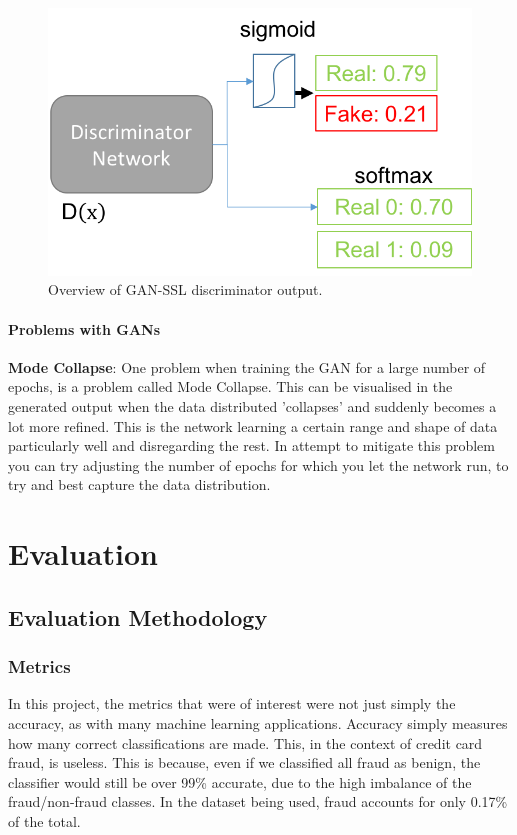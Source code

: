 \documentclass[12pt,a4paper,twoside]{report}
\begin{document}
\begin{figure}[H]
\centering
\includegraphics[scale=0.8]{gan-ssl}
\caption{Overview of GAN-SSL discriminator output.}
\label{fig:gan-ssl}
\end{figure}

\subsubsection{Problems with GANs}

\textbf{Mode Collapse}: One problem when training the GAN for a large number of epochs, is a problem called Mode Collapse. This can be visualised in the generated output when the data distributed 'collapses' and suddenly becomes a lot more refined. This is the network learning a certain range and shape of data particularly well and disregarding the rest. In attempt to mitigate this problem you can try adjusting the number of epochs for which you let the network run, to try and best capture the data distribution. 


\chapter{Evaluation}
\section{Evaluation Methodology}
\subsection{Metrics}
In this project, the metrics that were of interest were not just simply the accuracy, as with many machine learning applications. Accuracy simply measures how many correct classifications are made. This, in the context of credit card fraud, is useless. This is because, even if we classified all fraud as benign, the classifier would still be over 99\% accurate, due to the high imbalance of the fraud/non-fraud classes. In the dataset being used, fraud accounts for only 0.17\% of the total. 
\end{document}

